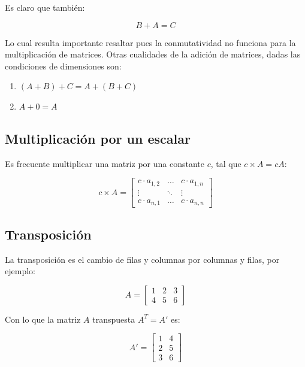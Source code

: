 \documentclass[
]{book}
\providecommand{\tightlist}{%
  \setlength{\itemsep}{0pt}\setlength{\parskip}{0pt}}
\begin{document}
Es claro que también:

\[B+A = C\]

Lo cual resulta importante resaltar pues la conmutatividad no funciona para la multiplicación de matrices. Otras cualidades de la adición de matrices, dadas las condiciones de dimensiones son:

\begin{enumerate}
\def\labelenumi{\arabic{enumi}.}
\tightlist
\item
  \((A+B)+C=A+(B+C)\)
\item
  \(A + 0 = A\)
\end{enumerate}

\hypertarget{multiplicaciuxf3n-por-un-escalar}{%
\subsection{Multiplicación por un escalar}\label{multiplicaciuxf3n-por-un-escalar}}

Es frecuente multiplicar una matriz por una constante \(c\), tal que \(c \times A = cA\):

\begin{equation}
c \times A = \left[ 
\begin{array}{ccc}
c  \cdot  a_{1, 2} & \dots & c \cdot a_{1, n} \\
\vdots   & \ddots & \vdots \\
c \cdot  a_{n, 1} & \dots & c  \cdot  a_{n, n}
\end{array} \right]
\end{equation}

\hypertarget{transposiciuxf3n}{%
\subsection{Transposición}\label{transposiciuxf3n}}

La transposición es el cambio de filas y columnas por columnas y filas, por ejemplo:

\begin{equation}
A = \left[ 
\begin{array}{rrr}
1 & 2 & 3 \\
4 & 5 & 6
\end{array}
\right]
\end{equation}

Con lo que la matriz \(A\) transpuesta \(A^T = A'\) es:

\begin{equation}
A' = \left[
\begin{array}{rr}
1 & 4 \\
2 & 5 \\
3 & 6
\end{array}
\right]
\end{equation}
\end{document}
